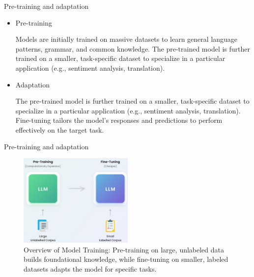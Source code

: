 \documentclass[serif, aspectratio=169]{beamer}
\begin{document}
\begin{frame}{Pre-training and adaptation}
    \begin{itemize}
        \item  
            \large{Pre-training}
            \vspace{0.5cm}
            \begin{outline}
                \1 Models are initially trained on massive datasets to learn general language patterns, grammar, and common knowledge.
                \vspace{0.2cm}
                \1 The pre-trained model is further trained on a smaller, task-specific dataset to specialize in a particular application (e.g., sentiment analysis, translation).
            \end{outline}
            \vspace{0.3cm}
        \item 
            \large{Adaptation}
            \vspace{0.5cm}
            \begin{outline}
                \1 The pre-trained model is further trained on a smaller, task-specific dataset to specialize in a particular application (e.g., sentiment analysis, translation).
                \1 Fine-tuning tailors the model's responses and predictions to perform effectively on the target task.
            \end{outline}
    \end{itemize}
\end{frame}

\begin{frame}{Pre-training and adaptation}
    \begin{figure}
        \centering
        \includegraphics[width=0.5\textwidth]{pic/image.jpg}
        \caption{Overview of Model Training: Pre-training on large, unlabeled data builds foundational knowledge, while fine-tuning on smaller, labeled datasets adapts the model for specific tasks.}
    \end{figure}
\end{frame}
\end{document}
